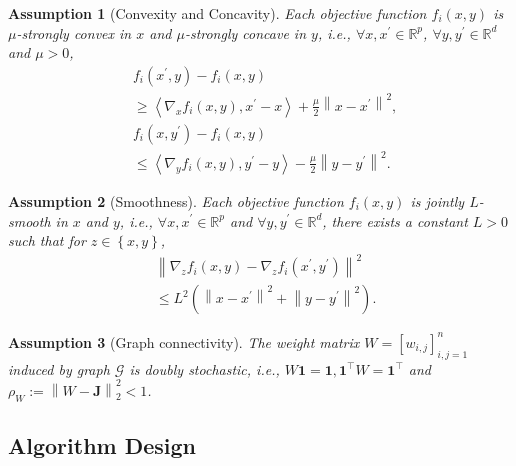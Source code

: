 \documentclass[letterpaper, 10 pt, conference]{ieeeconf}
\newtheorem{Ass}{Assumption}
\begin{document}
\begin{Ass}[Convexity and Concavity]\label{Ass_conv_conc}
Each objective function $f_i\left( x, y \right) $ is $\mu$-strongly convex in $x$ and $\mu$-strongly concave in $y$, i.e., $\forall x, x^{\prime}\in \mathbb{R}^p$, $\forall y, y^{\prime}\in \mathbb{R}^d$ and $\mu>0$,
\begin{equation*}
\begin{aligned}
&f_i\left( x^{\prime},y \right) -f_i\left( x,y \right) 
\\
&\geqslant \left< \nabla _xf_i\left( x,y \right) ,x^{\prime}-x \right> +\frac{\mu}{2}\left\| x-x^{\prime} \right\| ^2,
\\
&f_i\left( x,y^{\prime} \right) -f_i\left( x,y \right) 
\\
&\leqslant \left< \nabla _yf_i\left( x,y \right) ,y^{\prime}-y \right> -\frac{\mu}{2}\left\| y-y^{\prime} \right\| ^2.
\end{aligned}
\end{equation*}
\end{Ass}

\begin{Ass}[Smoothness]\label{Ass_smoothness}
Each objective function $f_i\left( x, y \right) $ is jointly $L$-smooth in $x$ and $y$, i.e., $\forall x, x^{\prime} \in \mathbb{R}^p$ and $\forall y, y^{\prime} \in \mathbb{R}^d$, there exists a constant $L>0$ such that for $z\in \left\{ x,y \right\}$,
\begin{equation*}
\begin{aligned}
&\left\| \nabla_z f_i\left( x,y \right) -\nabla_z f_i\left( x^{\prime},y^{\prime} \right) \right\| ^2
\\
&\leqslant L^2\left( \left\| x-x^{\prime} \right\| ^2+\left\| y-y^{\prime} \right\| ^2 \right).
\end{aligned}
\end{equation*}
\end{Ass}

\begin{Ass}[Graph connectivity] \label{Ass_graph}
The weight matrix $W=\left[ w_{i,j} \right] _{i,j=1}^{n}$ induced by graph $\mathcal{G}$ is doubly stochastic, i.e., $W\mathbf{1}=\mathbf{1},\mathbf{1}^{\top}W=\mathbf{1}^{\top}$ and $\rho _W:= \left\| W-\mathbf{J} \right\|_2 ^2 <1$.
\end{Ass}



\subsection{Algorithm Design}
\end{document}
